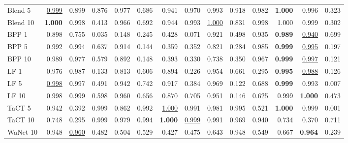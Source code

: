 \begin{table}[htbp]
\begin{adjustbox}{max width=\textwidth}
\begin{tabular}{lrrrrrrrrrrrrr}
Blend 5 & \underline{0.999} & 0.899 & 0.876 & 0.977 & 0.686 & 0.941 & 0.970 & 0.993 & 0.918 & 0.982 & \textbf{1.000} & 0.996 & \textcolor{black!45}{0.323} \\
Blend 10 & \textbf{1.000} & 0.998 & \textcolor{black!45}{0.413} & 0.966 & 0.692 & 0.944 & 0.993 & \underline{1.000} & 0.831 & 0.998 & 1.000 & 0.999 & \textcolor{black!45}{0.302} \\
BPP 1 & 0.898 & 0.755 & \textcolor{black!45}{0.035} & \textcolor{black!45}{0.148} & \textcolor{black!45}{0.245} & \textcolor{black!45}{0.428} & \textcolor{black!45}{0.071} & 0.921 & \textcolor{black!45}{0.498} & 0.935 & \textbf{0.989} & \underline{0.940} & 0.699 \\
BPP 5 & 0.992 & 0.994 & 0.637 & 0.914 & \textcolor{black!45}{0.144} & \textcolor{black!45}{0.359} & \textcolor{black!45}{0.352} & 0.821 & \textcolor{black!45}{0.284} & 0.985 & \textbf{0.999} & \underline{0.995} & \textcolor{black!45}{0.197} \\
BPP 10 & 0.989 & 0.977 & 0.579 & 0.892 & \textcolor{black!45}{0.148} & \textcolor{black!45}{0.393} & \textcolor{black!45}{0.330} & 0.738 & \textcolor{black!45}{0.350} & 0.967 & \textbf{0.999} & \underline{0.997} & \textcolor{black!45}{0.121} \\
LF 1 & 0.976 & 0.987 & \textcolor{black!45}{0.133} & 0.813 & 0.606 & 0.894 & \textcolor{black!45}{0.226} & 0.954 & 0.661 & \textcolor{black!45}{0.295} & \textbf{0.995} & \underline{0.988} & \textcolor{black!45}{0.126} \\
LF 5 & \underline{0.998} & 0.997 & \textcolor{black!45}{0.491} & 0.942 & 0.742 & 0.917 & \textcolor{black!45}{0.384} & 0.969 & \textcolor{black!45}{0.122} & 0.688 & \textbf{0.999} & 0.993 & \textcolor{black!45}{0.007} \\
LF 10 & 0.998 & 0.999 & 0.598 & 0.960 & 0.656 & 0.870 & 0.705 & 0.951 & \textcolor{black!45}{0.146} & 0.625 & \underline{0.999} & \textbf{1.000} & \textcolor{black!45}{0.473} \\
TaCT 5 & 0.942 & \textcolor{black!45}{0.392} & 0.999 & 0.862 & 0.992 & \underline{1.000} & 0.991 & 0.981 & 0.995 & 0.521 & \textbf{1.000} & 0.999 & \textcolor{black!45}{0.001} \\
TaCT 10 & 0.748 & \textcolor{black!45}{0.295} & 0.999 & 0.979 & 0.994 & \textbf{1.000} & \underline{0.999} & 0.991 & 0.969 & 0.940 & 0.734 & \textcolor{black!45}{0.370} & 0.711 \\
WaNet 10 & 0.948 & \underline{0.960} & \textcolor{black!45}{0.482} & 0.504 & 0.529 & \textcolor{black!45}{0.427} & \textcolor{black!45}{0.475} & 0.643 & 0.948 & 0.549 & 0.667 & \textbf{0.964} & \textcolor{black!45}{0.239} \\

\end{tabular}
\end{adjustbox}
\end{table}
